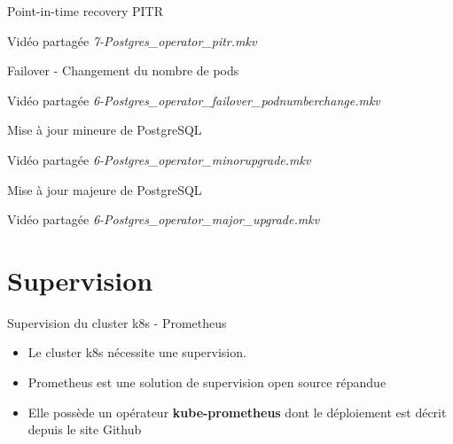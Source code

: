 
\begin{frame}[fragile]{Point-in-time recovery PITR}

   Vidéo partagée \textit{7-Postgres\_operator\_pitr.mkv}

\end{frame}


\begin{frame}[fragile]{Failover - Changement du nombre de pods}

   Vidéo partagée \textit{6-Postgres\_operator\_failover\_podnumberchange.mkv}

\end{frame}


\begin{frame}[fragile]{Mise à jour mineure de PostgreSQL}

   Vidéo partagée \textit{6-Postgres\_operator\_minorupgrade.mkv}

\end{frame}


\begin{frame}[fragile]{Mise à jour majeure de PostgreSQL}

   Vidéo partagée \textit{6-Postgres\_operator\_major\_upgrade.mkv}

\end{frame}


\section{Supervision}


\begin{frame}[fragile]{Supervision du cluster k8s - Prometheus}

\begin{itemize}
   \item Le cluster k8s nécessite une supervision.
   \item Prometheus est une solution de supervision open source répandue
   \item Elle possède un opérateur \textbf{kube-prometheus} dont le déploiement est décrit depuis le site Github
\end{itemize}

\end{frame}

